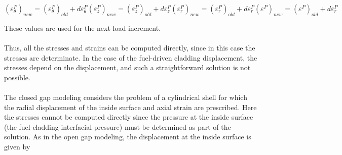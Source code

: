 \begin{subequations}
    
    \begin{equation}
        \left(\varepsilon^{P}_{\theta}\right)_{new}  = \left(\varepsilon^{P}_{\theta}\right)_{old} + d\varepsilon^{P}_{\theta} 
    \end{equation}

    \begin{equation}
            \left(\varepsilon^{P}_{z}\right)_{new}       = \left(\varepsilon^{P}_{z}\right)_{old} + d\varepsilon^{P}_{z}           
    \end{equation}

    \begin{equation}
            \left(\varepsilon^{P}_{r}\right)_{new}       = \left(\varepsilon^{P}_{r}\right)_{old} + d\varepsilon^{P}_{r}           
    \end{equation}
    
    \begin{equation}
            \left(\varepsilon^{P}\right)_{new}           = \left(\varepsilon^{P}\right)_{old} + d\varepsilon^{P}_{r}               
    \end{equation}
    \label{eq:plastic_strains_old_plus_delta}
\end{subequations}

These values are used for the next load increment.
\\
\\
Thus, all the stresses and strains can be computed directly, since in this case the stresses are
determinate. In the case of the fuel-driven cladding displacement, the stresses depend on the
displacement, and such a straightforward solution is not possible.
\\
\\
The closed gap modeling considers the problem of a cylindrical shell for which the radial
displacement of the inside surface and axial strain are prescribed. Here the stresses cannot be
computed directly since the pressure at the inside surface (the fuel-cladding interfacial pressure)
must be determined as part of the solution.
As in the open gap modeling, the displacement at the inside surface is
given by

